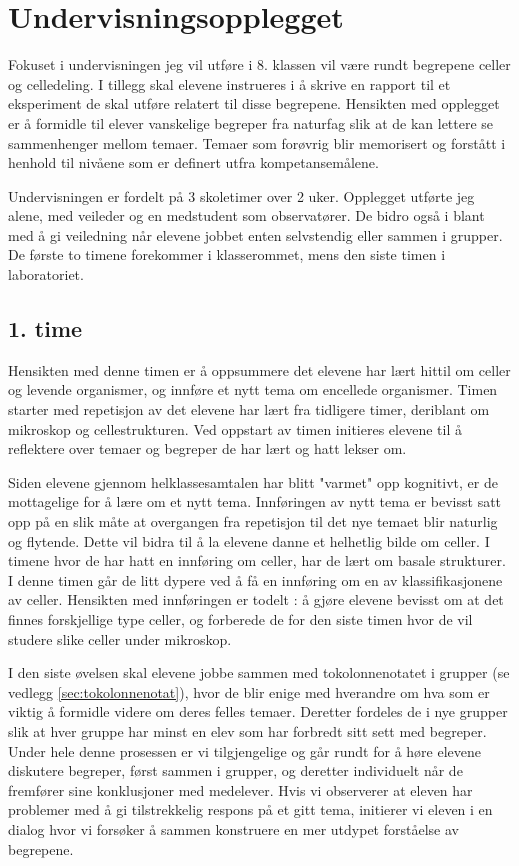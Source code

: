 \documentclass[main.tex]{subfiles}
\begin{document}
\section*{Undervisningsopplegget}
\label{sec:1}
Fokuset i undervisningen jeg vil utføre i 8. klassen vil være rundt begrepene celler og celledeling. 
I tillegg skal elevene instrueres i å skrive en rapport til et eksperiment de skal utføre relatert til disse begrepene.
Hensikten med opplegget er å formidle til elever vanskelige begreper fra naturfag slik at de kan lettere 
se sammenhenger mellom temaer. Temaer som forøvrig blir memorisert og forstått i henhold til nivåene 
som er definert utfra kompetansemålene. 

Undervisningen er fordelt på 3 skoletimer over 2 uker. Opplegget utførte jeg alene, med veileder og en 
medstudent som observatører. De bidro også i blant med å gi veiledning når elevene jobbet enten 
selvstendig eller sammen i grupper. De første to timene forekommer i klasserommet, mens den siste timen 
i laboratoriet.

\subsection*{1. time}

Hensikten med denne timen er å oppsummere det elevene har lært hittil om celler og 
levende organismer, og innføre et nytt tema om encellede organismer. Timen starter med repetisjon 
av det elevene har lært fra tidligere timer, deriblant om mikroskop og cellestrukturen. Ved oppstart 
av timen initieres elevene til å reflektere over temaer og begreper de har lært og hatt lekser 
om.
 
Siden elevene gjennom helklassesamtalen har blitt "varmet" opp kognitivt, er de mottagelige for å 
lære om et nytt tema. Innføringen av nytt tema er bevisst satt opp på en slik måte at overgangen 
fra repetisjon til det nye temaet blir naturlig og flytende. Dette vil bidra til å la elevene danne et 
helhetlig bilde om celler. I timene hvor de har hatt en innføring om celler, har de lært om basale 
strukturer. I denne timen går de litt dypere ved å få en innføring om en av klassifikasjonene av celler.
Hensikten med innføringen er todelt : å gjøre elevene bevisst om at det finnes forskjellige type
celler, og forberede de for den siste timen hvor de vil studere slike celler under mikroskop.
 
I den siste øvelsen skal elevene jobbe sammen med tokolonnenotatet i grupper (se 
vedlegg \ref{sec:tokolonnenotat}), hvor de blir enige med hverandre om hva som er viktig å formidle videre 
om deres felles temaer. Deretter fordeles de i nye grupper slik at hver gruppe har minst en elev som har 
forbredt sitt sett med begreper. Under hele denne prosessen er vi tilgjengelige og går rundt for å 
høre elevene diskutere begreper, først sammen i grupper, og deretter individuelt når de fremfører sine 
konklusjoner med medelever. Hvis vi observerer at eleven har problemer med å gi tilstrekkelig 
respons på et gitt tema, initierer vi eleven i en dialog hvor vi forsøker å sammen konstruere en 
mer utdypet forståelse av begrepene. 
\end{document}
